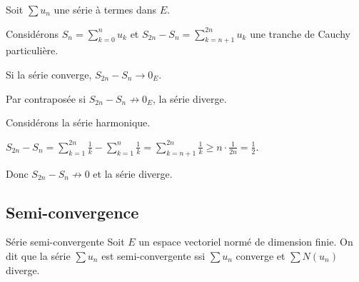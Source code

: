 \begin{proposition}{}{}
    Soit $\sum u_n$ une série à termes dans $E$.

    Considérons $\displaystyle S_n = \sum_{k = 0}^n u_k$ et $\displaystyle S_{2n} - S_n = \sum_{k = n + 1}^{2n} u_k$
    une tranche de Cauchy particulière.
    
    Si la série converge, $S_{2n} - S_n \longrightarrow 0_E$.

    Par contraposée si $S_{2n} - S_n \not \longrightarrow 0_E$, la série diverge. 
\end{proposition}

\begin{exemple}
    Considérons la série harmonique. 

    $\displaystyle S_{2n} - S_n = \sum_{k = 1}^{2n} \frac 1 k - \sum_{k = 1}^{n} \frac 1 k = \sum_{k = n + 1}^{2n} \frac 1 k \geqslant n \cdot \frac 1 {2n} = \frac 1 2$.

    Donc $S_{2n} - S_n \not \longrightarrow 0$ et la série diverge.
\end{exemple}

\subsection{Semi-convergence}

\begin{definition}{Série semi-convergente}{}
    Soit $E$ un espace vectoriel normé de dimension finie. On dit que la série $\sum u_n$ est semi-convergente 
    ssi $\sum u_n$ converge et $\sum N(u_n)$ diverge.
\end{definition}

